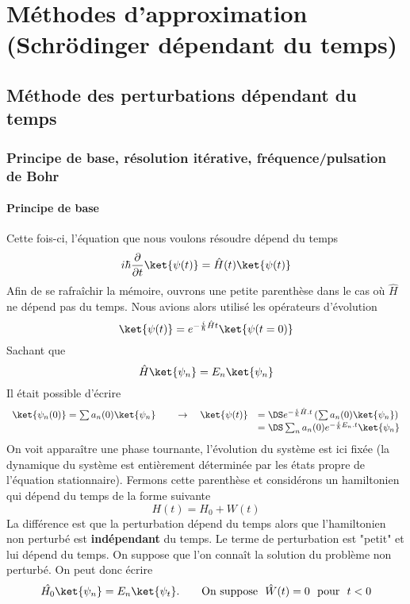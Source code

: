 \chapter{Méthodes d'approximation (Schrödinger dépendant du temps)}
\section{Méthode des perturbations dépendant du temps}
	\subsection{Principe de base, résolution itérative, fréquence/pulsation de Bohr}	
		\subsubsection{Principe de base}
	Cette fois-ci, l'équation que nous voulons résoudre dépend du temps
	\begin{equation}
	i\hbar\dfrac{\partial}{\partial t}\ket{\psi(t)} = \hat{H}(t)\ket{\psi(t)}
	\end{equation}
	Afin de se rafraîchir la mémoire, ouvrons une petite parenthèse dans le cas où 
	$\hat{H}$ ne dépend pas du temps. Nous avions alors utilisé les opérateurs 
	d'évolution
	\begin{equation}
	\ket{\psi(t)} = e^{-\frac{i}{\hbar}\hat{H}t}\ket{\psi(t=0)}
	\end{equation}
	Sachant que
	\begin{equation}
	\hat{H}\ket{\psi_n} = E_n\ket{\psi_n}
	\end{equation}
	Il était possible d'écrire
	\begin{equation}
	\begin{array}{ll}
	\ket{\psi_n(0)} = \sum a_n(0)\ket{\psi_n}\qquad\rightarrow\quad\ket{\psi(t)} &=\DS 
	e^{-\frac{i}{\hbar}\hat{H}.t}\left(\sum a_n(0)\ket{\psi_n}\right)\\
	&=\DS \sum_n a_n(0)e^{-\frac{i}{\hbar}E_n.t}\ket{\psi_n}
	\end{array}
	\end{equation}
	On voit apparaître une phase tournante, l'évolution du système est ici fixée (la dynamique 
	du système est entièrement déterminée par les états propre de l'équation stationnaire). Fermons 
	cette parenthèse et considérons un hamiltonien qui dépend du temps de la forme suivante
	\begin{equation}
	H(t) = H_0 + W(t)
	\end{equation}
	La différence est que la perturbation 	dépend du temps alors que l'hamiltonien non perturbé est 
	\textbf{indépendant} du temps. Le terme de perturbation est "petit" et lui dépend du temps. 
	On suppose que l'on connaît la solution du problème non perturbé. On peut donc écrire
	\begin{equation}
	\hat{H_0}\ket{\psi_n} = E_n\ket{\psi_t}.\qquad \text{On suppose }\ \hat{W}(t)=0\ \text{ pour }\ t<0
	\end{equation}

